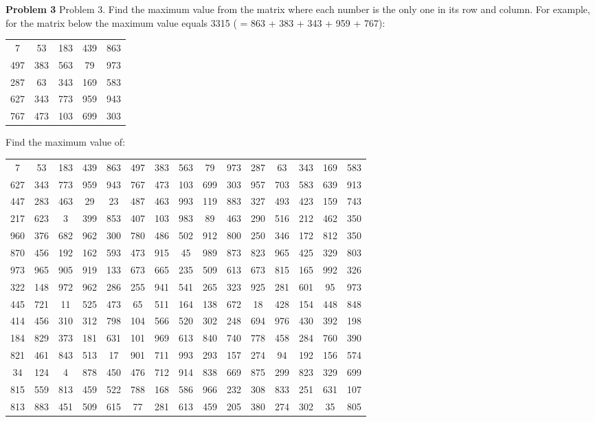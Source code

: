\documentclass{article}
\begin{document}
{\bf Problem 3} 
Problem 3.
Find the maximum value from the matrix where each number is the only one in its row and column. For
example, for the matrix below the maximum value equals 3315 ( = 863 + 383 + 343 + 959 + 767):

\hspace*{\fill}
\begin{tabular}{*{5}{c}}
7 & 53 & 183 & 439 & {\color{green} 863}\\
497 & {\color{green} 383} & 563 & 79 & 973\\
287 & 63 & {\color{green} 343} & 169 & 583\\
627 & 343 & 773 & {\color{green} 959} & 943\\
{\color{green} 767} & 473 & 103 & 699 & 303
\end{tabular}
\hspace*{\fill}

Find the maximum value of:

\begin{tabular}{*{15}{c}}
7 & 53 & 183 & 439 & 863 & 497 & 383 & 563 & 79 & 973 & 287 & 63 & 343 & 169 & 583\\
627 & 343 & 773 & 959 & 943 & 767 & 473 & 103 & 699 & 303 & 957 & 703 & 583 & 639 & 913\\
447 & 283 & 463 & 29 & 23 & 487 & 463 & 993 & 119 & 883 & 327 & 493 & 423 & 159 & 743\\
217 & 623 & 3 & 399 & 853 & 407 & 103 & 983 & 89 & 463 & 290 & 516 & 212 & 462 & 350\\
960 & 376 & 682 & 962 & 300 & 780 & 486 & 502 & 912 & 800 & 250 & 346 & 172 & 812 & 350\\
870 & 456 & 192 & 162 & 593 & 473 & 915 & 45 & 989 & 873 & 823 & 965 & 425 & 329 & 803\\
973 & 965 & 905 & 919 & 133 & 673 & 665 & 235 & 509 & 613 & 673 & 815 & 165 & 992 & 326\\
322 & 148 & 972 & 962 & 286 & 255 & 941 & 541 & 265 & 323 & 925 & 281 & 601 & 95 & 973\\
445 & 721 & 11 & 525 & 473 & 65 & 511 & 164 & 138 & 672 & 18 & 428 & 154 & 448 & 848\\
414 & 456 & 310 & 312 & 798 & 104 & 566 & 520 & 302 & 248 & 694 & 976 & 430 & 392 & 198\\
184 & 829 & 373 & 181 & 631 & 101 & 969 & 613 & 840 & 740 & 778 & 458 & 284 & 760 & 390\\
821 & 461 & 843 & 513 & 17 & 901 & 711 & 993 & 293 & 157 & 274 & 94 & 192 & 156 & 574\\
34 & 124 & 4 & 878 & 450 & 476 & 712 & 914 & 838 & 669 & 875 & 299 & 823 & 329 & 699\\
815 & 559 & 813 & 459 & 522 & 788 & 168 & 586 & 966 & 232 & 308 & 833 & 251 & 631 & 107\\
813 & 883 & 451 & 509 & 615 & 77 & 281 & 613 & 459 & 205 & 380 & 274 & 302 & 35 & 805
\end{tabular}
\end{document}
